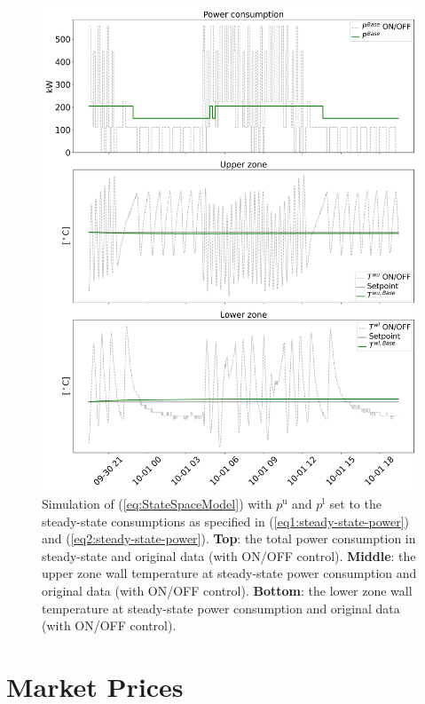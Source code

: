 \documentclass[sigconf]{acmart}
\begin{document}
\begin{figure}[t]
    \centering
    \includegraphics[width=\columnwidth]{figures/4thOrderModelVisualizationSteadyState.png}
    \caption{Simulation of (\ref{eq:StateSpaceModel}) with $p^{\text{u}}$ and $p^{\text{l}}$ set to the steady-state consumptions as specified in (\ref{eq1:steady-state-power}) and (\ref{eq2:steady-state-power}). \textbf{Top}: the total power consumption in steady-state and original data (with ON/OFF control). \textbf{Middle}: the upper zone wall temperature at steady-state power consumption and original data (with ON/OFF control). \textbf{Bottom}: the lower zone wall temperature at steady-state power consumption and original data (with ON/OFF control).}
    \label{fig:4thOrderModelVisualizationSteadyState}
\end{figure}

\section{Market Prices}\label{app:market-prices}
\end{document}
